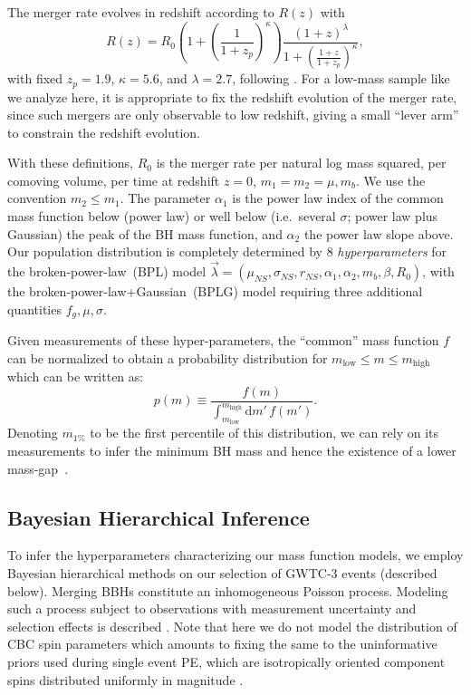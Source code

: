 \documentclass[modern]{aastex631}
\newcommand{\dd}{\ensuremath{\mathrm{d}}}
\begin{document}
The merger rate evolves in redshift according to $R(z)$ with 
\begin{equation}
    R(z) = R_0 \left( 1 + \left( \frac{1}{1 + z_p} \right)^\kappa \right) \frac{\left( 1 + z \right)^\lambda}{1 + \left( \frac{1+z}{1+z_p} \right)^\kappa}, 
\end{equation}
with fixed $z_p = 1.9$, $\kappa = 5.6$, and $\lambda = 2.7$, following
\citet{Madau2014}.  For a low-mass sample like we analyze here, it is
appropriate to fix the redshift evolution of the merger rate, since such mergers
are only observable to low redshift, giving a small ``lever arm'' to constrain
the redshift evolution.

With these definitions, $R_0$ is the merger rate per natural log mass squared,
per comoving volume, per time at redshift $z = 0$, $m_1 = m_2 = \mu, m_b$.  We
use the convention $m_2 \leq m_1$.  The parameter $\alpha_1$ is the power law
index of the common mass function below (power law) or well below (i.e.\ several
$\sigma$; power law plus Gaussian) the peak of the BH mass function, and
$\alpha_2$ the power law slope above.  Our population distribution is completely
determined by 8 \textit{hyperparameters} for the broken-power-law~(BPL) model
$\vec{\lambda}=(\mu_{NS}, \sigma_{NS}, r_{NS}, \alpha_1,\alpha_2,m_b, \beta,
R_0)$, with the broken-power-law+Gaussian~(BPLG) model requiring three
additional quantities $f_g,\mu,\sigma$.

Given measurements of these hyper-parameters, the ``common'' mass function $f$ can be normalized to obtain a probability distribution
for $m_\mathrm{low} \leq m \leq m_\mathrm{high}$ which can be written as:
\begin{equation}
    \label{eq:pm-definition}
    p(m) \equiv \frac{f(m)}{\int_{m_\mathrm{low}}^{m_\mathrm{high}} \dd m' \, f(m')}.
\end{equation}
\noindent Denoting $m_{1\%}$ to be the first percentile of this distribution, we can rely on its measurements to infer the minimum BH mass and hence the existence of a lower mass-gap~\citep{Farr:2010tu}. 

\subsection{Bayesian Hierarchical Inference}
\noindent
{}
To infer the hyperparameters characterizing our mass function models, we employ
Bayesian hierarchical methods on our selection of GWTC-3 events (described
below). Merging BBHs constitute an inhomogeneous Poisson
process.  Modeling such a process subject to observations with
measurement uncertainty and selection effects is described
\citet{Mandel:2018mve,pop-vitale,popgw2,popgw3}.
Note that here we do not model the distribution of CBC spin parameters which
amounts to fixing the same to the uninformative priors used during single event
PE, which are isotropically oriented component spins distributed uniformly in
magnitude \citep{KAGRA:2021duu}.  
\end{document}
